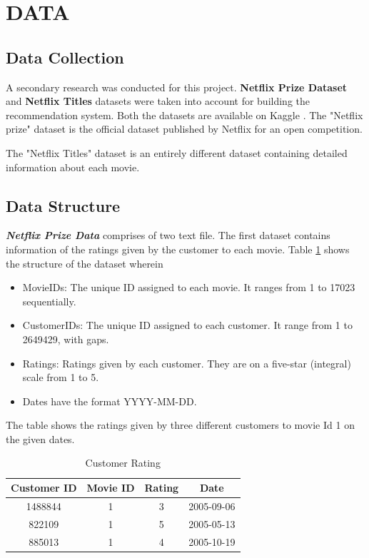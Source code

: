\documentclass[a4paper,10pt]{article}
\begin{document}
\section{DATA}

\subsection{Data Collection}

A secondary research was conducted for this project.  \textbf{Netflix Prize Dataset} and \textbf{Netflix Titles}  datasets were taken into account for building the recommendation system. Both the datasets are available on Kaggle \cite{kaggle}. The "Netflix prize" dataset is the official dataset published by Netflix for an open competition. 

The "Netflix Titles" dataset is an entirely different dataset containing detailed information about each movie.

\subsection{Data Structure}

\textbf{\textit{Netflix Prize Data}} comprises of two text file. The first dataset contains information of the ratings given by the customer to each movie. Table \ref{Data_1} shows the structure of the dataset wherein 

\begin{itemize}
  \item MovieIDs: The unique ID assigned to each movie. It ranges from 1 to 17023 sequentially.
  \item CustomerIDs: The unique ID assigned to each customer. It range from 1 to 2649429, with gaps.
  \item Ratings: Ratings given by each customer. They are on a five-star (integral) scale from 1 to 5.
  \item Dates have the format YYYY-MM-DD.
\end{itemize}
The table shows the ratings given by three different customers to movie Id 1 on the given dates. 






\begin{table}
    \center 
    
    \begin{tabular}{|c|c|c|c|} \hline 
         Customer ID&  Movie ID&  Rating& Date\\ \hline 
         1488844&  1&  3& 2005-09-06
\\ \hline 
         822109&  1&  5& 2005-05-13
\\ \hline 
         885013&  1&  4& 2005-10-19
\\ \hline
    \end{tabular}
    \caption{Customer Rating}   
    \label{Data_1} 
\end{table}
\end{document}
